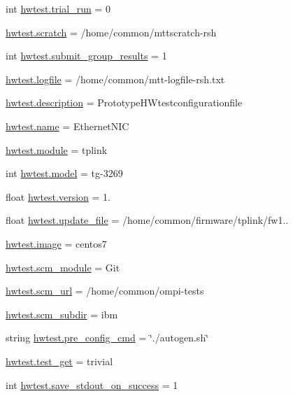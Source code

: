 \begin{DoxyCompactItemize}
\item 
int \hyperlink{namespacehwtest_a2974a3de34764ea05c838464d476f407}{hwtest.\-trial\-\_\-run} = 0
\item 
\hyperlink{namespacehwtest_a877f35b716655c4bfeb4955018d305cb}{hwtest.\-scratch} = /home/common/mttscratch-\/rsh
\item 
int \hyperlink{namespacehwtest_ae28e9902dd28944ecda9bacac16b28b5}{hwtest.\-submit\-\_\-group\-\_\-results} = 1
\item 
\hyperlink{namespacehwtest_a741c9ed9ca6a98101b7fb9d19d68c869}{hwtest.\-logfile} = /home/common/mtt-\/logfile-\/rsh.\-txt
\item 
\hyperlink{namespacehwtest_a29832146debe207ba418a2c34a72da74}{hwtest.\-description} = Prototype\-H\-Wtestconfigurationfile
\item 
\hyperlink{namespacehwtest_afe5609741ec9bca621277528b05b63c8}{hwtest.\-name} = Ethernet\-N\-I\-C
\item 
\hyperlink{namespacehwtest_acc1aaeb8f3c26bd3054520cba5b8dfe5}{hwtest.\-module} = tplink
\item 
int \hyperlink{namespacehwtest_ae54fc3a5be1cdc41fa34eb22483e6909}{hwtest.\-model} = tg-\/3269
\item 
float \hyperlink{namespacehwtest_a4cd2f078f70d7159e347c0a9ddd51f84}{hwtest.\-version} = 1.
\item 
float \hyperlink{namespacehwtest_a55a50eaac0f3463a3fc21e41b75050ab}{hwtest.\-update\-\_\-file} = /home/common/firmware/tplink/fw1..
\item 
\hyperlink{namespacehwtest_a5c55bb57a925e013f9ffd6f3e5ca99d7}{hwtest.\-image} = centos7
\item 
\hyperlink{namespacehwtest_acb222c4c00407c64de9ba5ab1c303cec}{hwtest.\-scm\-\_\-module} = Git
\item 
\hyperlink{namespacehwtest_a37abe4e88b4c1525a3b343f47dfc2862}{hwtest.\-scm\-\_\-url} = /home/common/ompi-\/tests
\item 
\hyperlink{namespacehwtest_a7d494d98bb3aaabad59bf16dd7c4c9d2}{hwtest.\-scm\-\_\-subdir} = ibm
\item 
string \hyperlink{namespacehwtest_a0b55d030449a5be7b3f9946712208ee4}{hwtest.\-pre\-\_\-config\-\_\-cmd} = \char`\"{}./autogen.\-sh\char`\"{}
\item 
\hyperlink{namespacehwtest_a10d7a3bc8e20a9b333fb253328ca7e8c}{hwtest.\-test\-\_\-get} = trivial
\item 
int \hyperlink{namespacehwtest_afffd8e55c08b72fb88423c7446b90d70}{hwtest.\-save\-\_\-stdout\-\_\-on\-\_\-success} = 1

\end{DoxyCompactItemize}
